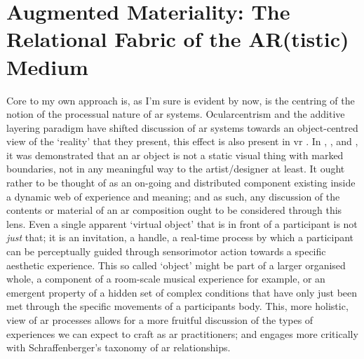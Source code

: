 \section[Augmented Materiality]{Augmented Materiality: The Relational Fabric of the AR(tistic) Medium}\label{sec: discussion-medium-material}
Core to my own approach is, as I'm sure is evident by now, is the centring of the notion of the processual nature of \gls{ar} systems. Ocularcentrism and the additive layering paradigm have shifted discussion of \gls{ar} systems towards an object-centred view of the `reality' that they present, this effect is also present in \gls{vr} \citep[]{hovhannisyan2019}. In \textit{}, \textit{}, and \textit{}, it was demonstrated that an \gls{ar} object is not a static visual thing with marked boundaries, not in any meaningful way to the artist/designer at least. It ought rather to be thought of as an on-going and distributed component existing inside a dynamic web of experience and meaning; and as such, any discussion of the contents or material of an \gls{ar} composition ought to be considered through this lens. Even a single apparent `virtual object' that is in front of a participant is not \textit{just} that; it is an invitation, a handle, a real-time process by which a participant can be perceptually guided through sensorimotor action towards a specific aesthetic experience. This so called `object' might be part of a larger organised whole, a component of a room-scale musical experience for example, or an emergent property of a hidden set of complex conditions that have only just been met through the specific movements of a participants body. This, more holistic, view of \gls{ar} processes allows for a more fruitful discussion of the types of experiences we can expect to craft as \gls{ar} practitioners; and engages more critically with Schraffenberger's taxonomy of \gls{ar} relationships.


